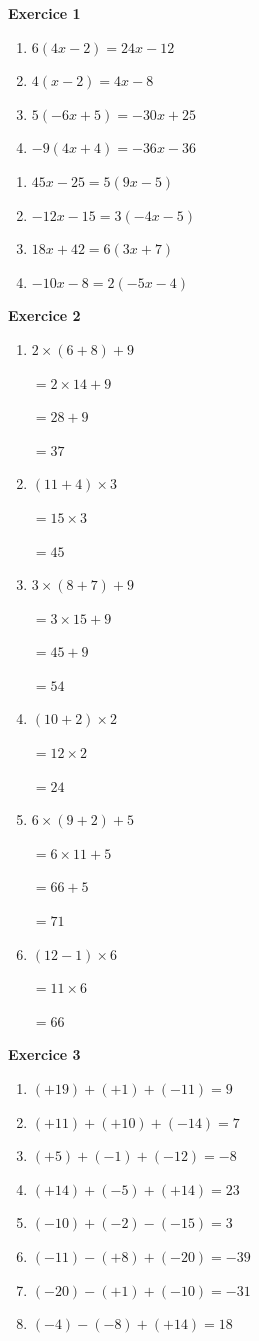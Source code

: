\documentclass[12pt,a4paper,french]{article}
\begin{document}
\noindent\textbf{Exercice 1}\par
\smallskip
\begin{enumerate}
\item $6(4x - 2) = 24x - 12$
\item $4(x - 2) = 4x - 8$
\item $5(-6x + 5) = -30x + 25$
\item $-9(4x + 4) = -36x - 36$
\end{enumerate}
\begin{enumerate}
\item $45x - 25 = 5(9x - 5)$
\item $-12x - 15 = 3(-4x - 5)$
\item $18x + 42 = 6(3x + 7)$
\item $-10x - 8 = 2(-5x - 4)$
\end{enumerate}
\medskip

\noindent\textbf{Exercice 2}\par
\smallskip
\begin{enumerate}
\item $2 \times (6 + 8) + 9$

$= 2 \times 14 + 9$

$= 28 + 9$

$= 37$
\item $(11 + 4) \times 3$

$= 15 \times 3$

$= 45$
\item $3 \times (8 + 7) + 9$

$= 3 \times 15 + 9$

$= 45 + 9$

$= 54$
\item $(10 + 2) \times 2$

$= 12 \times 2$

$= 24$
\item $6 \times (9 + 2) + 5$

$= 6 \times 11 + 5$

$= 66 + 5$

$= 71$
\item $(12 - 1) \times 6$

$= 11 \times 6$

$= 66$
\end{enumerate}
\medskip

\noindent\textbf{Exercice 3}\par
\smallskip
\begin{enumerate}
\item $(+19) + (+1) + (-11) = 9$
\item $(+11) + (+10) + (-14) = 7$
\item $(+5) + (-1) + (-12) = -8$
\item $(+14) + (-5) + (+14) = 23$
\item $(-10) + (-2) - (-15) = 3$
\item $(-11) - (+8) + (-20) = -39$
\item $(-20) - (+1) + (-10) = -31$
\item $(-4) - (-8) + (+14) = 18$
\end{enumerate}
\medskip
\end{document}
